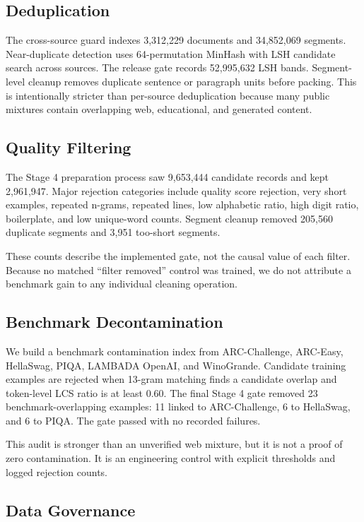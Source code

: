\documentclass[11pt]{article}
\begin{document}
\subsection{Deduplication}

The cross-source guard indexes 3,312,229 documents and 34,852,069 segments. Near-duplicate detection uses 64-permutation MinHash with LSH candidate search across sources. The release gate records 52,995,632 LSH bands. Segment-level cleanup removes duplicate sentence or paragraph units before packing. This is intentionally stricter than per-source deduplication because many public mixtures contain overlapping web, educational, and generated content.

\subsection{Quality Filtering}

The Stage 4 preparation process saw 9,653,444 candidate records and kept 2,961,947. Major rejection categories include quality score rejection, very short examples, repeated n-grams, repeated lines, low alphabetic ratio, high digit ratio, boilerplate, and low unique-word counts. Segment cleanup removed 205,560 duplicate segments and 3,951 too-short segments.

These counts describe the implemented gate, not the causal value of each filter. Because no matched ``filter removed'' control was trained, we do not attribute a benchmark gain to any individual cleaning operation.

\subsection{Benchmark Decontamination}

We build a benchmark contamination index from ARC-Challenge, ARC-Easy, HellaSwag, PIQA, LAMBADA OpenAI, and WinoGrande. Candidate training examples are rejected when 13-gram matching finds a candidate overlap and token-level LCS ratio is at least 0.60. The final Stage 4 gate removed 23 benchmark-overlapping examples: 11 linked to ARC-Challenge, 6 to HellaSwag, and 6 to PIQA. The gate passed with no recorded failures.

This audit is stronger than an unverified web mixture, but it is not a proof of zero contamination. It is an engineering control with explicit thresholds and logged rejection counts.

\subsection{Data Governance}
\end{document}

